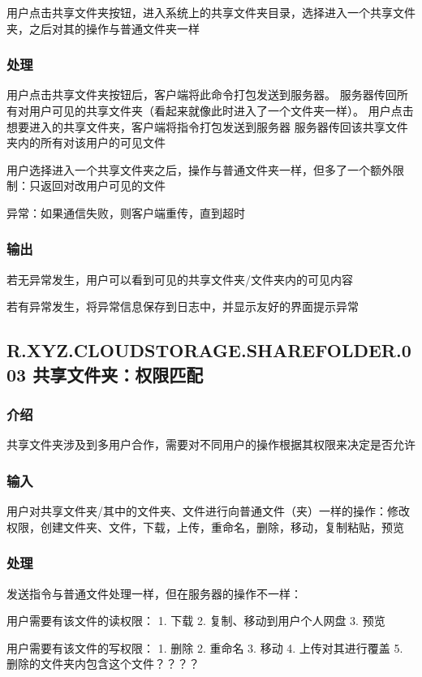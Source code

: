 用户点击共享文件夹按钮，进入系统上的共享文件夹目录，选择进入一个共享文件夹，之后对其的操作与普通文件夹一样

\subsubsection{处理} 

用户点击共享文件夹按钮后，客户端将此命令打包发送到服务器。
服务器传回所有对用户可见的共享文件夹（看起来就像此时进入了一个文件夹一样）。
用户点击想要进入的共享文件夹，客户端将指令打包发送到服务器
服务器传回该共享文件夹内的所有对该用户的可见文件

用户选择进入一个共享文件夹之后，操作与普通文件夹一样，但多了一个额外限制：只返回对改用户可见的文件

异常：如果通信失败，则客户端重传，直到超时
 
\subsubsection{输出} 
若无异常发生，用户可以看到可见的共享文件夹/文件夹内的可见内容

若有异常发生，将异常信息保存到日志中，并显示友好的界面提示异常


\subsection{R.XYZ.CLOUDSTORAGE.SHAREFOLDER.003 共享文件夹：权限匹配}
 
\subsubsection{介绍}
共享文件夹涉及到多用户合作，需要对不同用户的操作根据其权限来决定是否允许

\subsubsection{输入} 
用户对共享文件夹/其中的文件夹、文件进行向普通文件（夹）一样的操作：修改权限，创建文件夹、文件，下载，上传，重命名，删除，移动，复制粘贴，预览

\subsubsection{处理} 
发送指令与普通文件处理一样，但在服务器的操作不一样：

用户需要有该文件的读权限：
1. 下载
2. 复制、移动到用户个人网盘
3. 预览

用户需要有该文件的写权限：
1. 删除
2. 重命名
3. 移动
4. 上传对其进行覆盖
5. 删除的文件夹内包含这个文件？？？？

